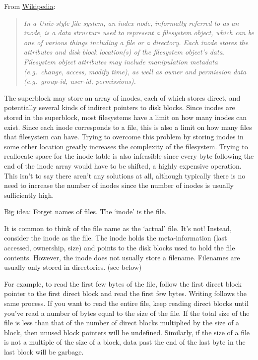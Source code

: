 From \href{http://en.wikipedia.org/wiki/Inode}{Wikipedia}:

\begin{quote}
  \emph{In a Unix-style file system, an index node, informally referred to as an inode, is a data structure used to represent a filesystem object, which can be one of various things including a file or a directory.
    Each inode stores the attributes and disk block location(s) of the filesystem object's data.
    Filesystem object attributes may include manipulation metadata (e.g.~change, access, modify time), as well as owner and permission data (e.g.~group-id, user-id, permissions).}
\end{quote}

The superblock may store an array of inodes, each of which stores direct, and potentially several kinds of indirect pointers to disk blocks.
Since inodes are stored in the superblock, most filesystems have a limit on how many inodes can exist.
Since each inode corresponds to a file, this is also a limit on how many files that filesystem can have.
Trying to overcome this problem by storing inodes in some other location greatly increases the complexity of the filesystem.
Trying to reallocate space for the inode table is also infeasible since every byte following the end of the inode array would have to be shifted, a highly expensive operation.
This isn't to say there aren't any solutions at all, although typically there is no need to increase the number of inodes since the number of inodes is usually sufficiently high.

Big idea: Forget names of files. The `inode' is the file.

It is common to think of the file name as the `actual' file.
It's not!
Instead, consider the inode as the file.
The inode holds the meta-information (last accessed, ownership, size) and points to the disk blocks used to hold the file contents.
However, the inode does not usually store a filename.
Filenames are usually only stored in directories. (see below)

For example, to read the first few bytes of the file, follow the first direct block pointer to the first direct block and read the first few bytes.
Writing follows the same process.
If you want to read the entire file, keep reading direct blocks until you've read a number of bytes equal to the size of the file.
If the total size of the file is less than that of the number of direct blocks multiplied by the size of a block, then unused block pointers will be undefined.
Similarly, if the size of a file is not a multiple of the size of a block, data past the end of the last byte in the last block will be garbage.

